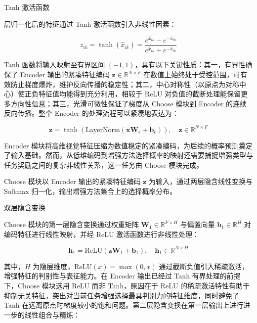 Tanh 激活函数

层归一化后的特征通过 Tanh 激活函数引入非线性因素：

\begin{equation}
    z_{ik} = \tanh(\hat{x}_{ik}) = \frac{e^{\hat{x}_{ik}} - e^{-\hat{x}_{ik}}}{e^{\hat{x}_{ik}} + e^{-\hat{x}_{ik}}}
\end{equation}

Tanh 函数将输入映射至有界区间 $(-1, 1)$，具有以下关键性质：其一，有界性确保了 Encoder 输出的紧凑特征编码 $\mathbf{z} \in \mathbb{R}^{N \times F}$ 在数值上始终处于受控范围，可有效防止梯度爆炸，维护反向传播的稳定性；其二，中心对称性（以原点为对称中心）使正负特征值均能得到充分利用，相较于 ReLU 对负值的截断处理能保留更多方向性信息；其三，光滑可微性保证了梯度从 Choose 模块到 Encoder 的连续反向传播。整个 Encoder 的处理流程可以紧凑地表达为：

\begin{equation}
    \mathbf{z} = \tanh\!\left(\mathrm{LayerNorm}\!\left(\mathbf{x}\mathbf{W}_e + \mathbf{b}_e\right)\right), \quad \mathbf{z} \in \mathbb{R}^{N \times F}
\end{equation}

Encoder 模块将高维视觉特征压缩为数值稳定的紧凑编码，为后续的概率预测奠定了输入基础。然而，从低维编码到增强方法选择概率的映射还需要捕捉增强类型与任务奖励之间的复杂非线性关系，这一任务由 Choose 模块完成。


Choose 模块以 Encoder 输出的紧凑特征编码 $\mathbf{z}$ 为输入，通过两层隐含线性变换与 Softmax 归一化，输出增强方法集合上的选择概率分布。

双层隐含变换

Choose 模块的第一层隐含变换通过权重矩阵 $\mathbf{W}_1 \in \mathbb{R}^{F \times H}$ 与偏置向量 $\mathbf{b}_1 \in \mathbb{R}^H$ 对编码特征进行线性映射，并经 ReLU 激活函数进行非线性处理：

\begin{equation}
    \mathbf{h}_1 = \text{ReLU}(\mathbf{z} \mathbf{W}_1 + \mathbf{b}_1), \quad \mathbf{h}_1 \in \mathbb{R}^{N \times H}
\end{equation}

其中，$H$ 为隐层维度，$\text{ReLU}(x) = \max(0, x)$ 通过截断负值引入稀疏激活，增强特征的判别性与表征能力。在 Encoder 输出已经过 Tanh 有界处理的前提下，Choose 模块选用 ReLU 而非 Tanh，原因在于 ReLU 的稀疏激活特性有助于抑制无关特征，突出对当前任务增强选择最具判别力的特征维度，同时避免了 Tanh 在远离原点时梯度较小的饱和问题。第二层隐含变换在第一层输出上进行进一步的线性组合与精炼：

